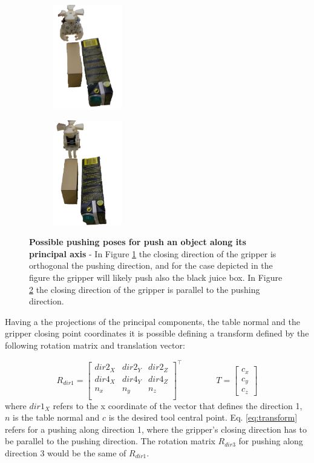 \begin{figure}[h]
\centering
\begin{subfigure}[t]{0.45\textwidth}
\centering
\includegraphics[width=3cm]{Img/pushing/pushing333.png}
\caption{}\label{fig:pushing_way1}
\end{subfigure}
\begin{subfigure}[t]{0.45\textwidth}
\centering
\includegraphics[width=3cm]{Img/pushing/pushing222.png}
\caption{}\label{fig:pushing_way2}
\end{subfigure}
\caption{\textbf{Possible pushing poses for push an object along its principal axis} - In Figure \ref{fig:pushing_way1} the closing direction of the gripper is orthogonal the pushing direction, and for the case depicted in the figure the gripper will likely push also the black juice box. In Figure \ref{fig:pushing_way2} the closing direction of the gripper is parallel to the pushing direction.}\label{fig:pushing_way}
\end{figure}

Having a the projections of the principal components, the table normal and the gripper closing point coordinates it is possible defining a transform defined by the following rotation matrix and translation vector:

\begin{equation}
R_{dir1} =
\begin{bmatrix}
dir2_X & dir2_Y & dir2_Z \\
dir4_X & dir4_Y & dir4_Z \\
n_x & n_y & n_z \\
\end{bmatrix}^{\top}
\qquad \qquad
T=
\begin{bmatrix}
c_x \\ c_y \\ c_z
\end{bmatrix}
\label{eq:transform}
\end{equation}
where $dir1_X$ refers to the x coordinate of the vector that defines the direction 1, $n$ is the table normal and $c$ is the desired tool central point. Eq. \ref{eq:transform} refers for a pushing along direction 1, where the gripper's closing direction has to be parallel to the pushing direction. The rotation matrix $R_{dir3}$ for pushing along direction 3 would be the same of $R_{dir1}$. 

